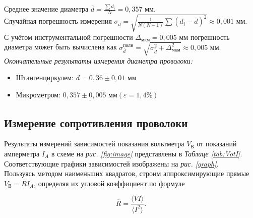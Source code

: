 \documentclass[a4paper,12pt]{article} %
\begin{document}
Среднее значение диаметра $ \overline{d} = \frac{\sum d_i}{N} = 0,357 \text{ мм}$.\\

Случайная погрешность измерения $ \sigma_{\overline{d}} = \sqrt{\frac{1}{N  (N-1)}\sum(d_i-\overline{d})^2} \approx 0,001 \text{ мм}$.\\

С учётом инструментальной погрешности $ \Delta_\text{мкм} = 0,005$ мм погрешность диаметра может быть вычислена как $ \sigma^{\text{полн}}_{\overline{d}} = \sqrt{\sigma^2_{\overline{d}} + \Delta^2_{\text{мкм}}} \approx 0,005 \text{ мм}$. \\

\textit{Окончательные результаты измерения диаметра проволоки:}

\begin{itemize}
	\item Штангенциркулем: $ d = 0,36 \pm 0,01 \text{ мм}  $
	\item Микрометром:  $ \underline{0,357 \pm 0,005 \text{ мм}} \left(\varepsilon = 1,4 \%\right)  $
\end{itemize}
\subsection{Измерение сопротивления проволоки}

Результаты измерений зависимостей показания вольтметра $ V_\text{В} $ от показаний амперметра $ I_A $ в схеме на \textit{рис.  \ref{fig:image}} представлены в \textit{Таблице \ref{tab:VotI}}. Соответствующие графики зависимостей изображены на \textit{рис. \ref{graph}}.\\

Пользуясь методом наименьших квадратов, строим аппроксимирующие прямые $ V_\text{В} = \overline{R}I_A $, определяя их угловой коэффициент по формуле

\begin{equation}
\overline{R} = \frac{\langle VI \rangle}{\langle I^2 \rangle}.
\end{equation}
\end{document}
